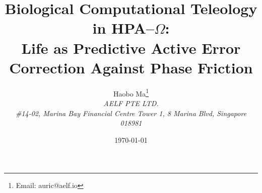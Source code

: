 \documentclass[11pt,a4paper]{article}
\title{Biological Computational Teleology in HPA--\texorpdfstring{$\Omega$}{Omega}:\\
Life as Predictive Active Error Correction Against Phase Friction}
\author{Haobo Ma\thanks{Email: auric@aelf.io} \\
\textit{AELF PTE LTD.} \\
\textit{\#14-02, Marina Bay Financial Centre Tower 1, 8 Marina Blvd, Singapore 018981}}
\date{\today}
\begin{document}
\maketitle
















\FloatBarrier
\appendix


\FloatBarrier

\end{document}

